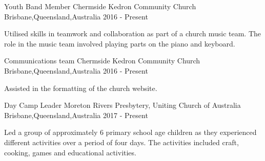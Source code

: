 \begin{cventries}

\cventry
{Youth Band Member} %
{Chermside Kedron Community Church} %
{Brisbane,Queensland,Australia} %
{2016 - Present} %
{ %
\begin{cvitems}
	\item {Utilised skills in teamwork and collaboration as part of a church music team. The role in the music team involved playing parts on the piano and keyboard.}
\end{cvitems}
}


\cventry
{Communications team} %
{Chermside Kedron Community Church} %
{Brisbane,Queensland,Australia} %
{2016 - Present} %
{ %
	\begin{cvitems}
		\item {Assisted in the formatting of the church website.}
	\end{cvitems}
}


\cventry
{Day Camp Leader} %
{Moreton Rivers Presbytery, Uniting Church of Australia} %
{Brisbane,Queensland,Australia} %
{2017 - Present} %
{ %
	\begin{cvitems}
		\item {Led a group of approximately 6 primary school age children as they experienced different activities over a period of four days. The activities included craft, cooking, games and educational activities.}
	\end{cvitems}
}

\end{cventries}